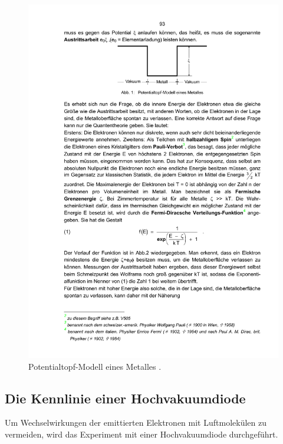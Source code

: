 \begin{figure}
  \centering
  \includegraphics[scale=0.8]{content/potentialtopf.pdf}
\caption{Potentialtopf-Modell eines Metalles \cite{anleitung504}.}
  \label{fig:potentialtopf}
\end{figure}

\subsection{Die Kennlinie einer Hochvakuumdiode}
Um Wechselwirkungen der emittierten Elektronen mit Luftmolekülen zu vermeiden, wird das Experiment mit einer Hochvakuumdiode durchgeführt.

